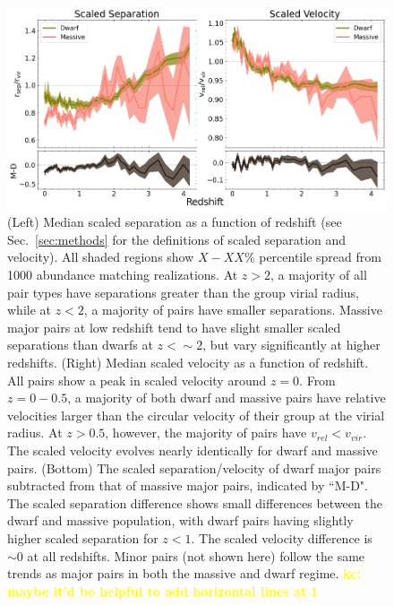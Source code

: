 \documentclass[twocolumn]{aastex631}
\newcommand{\kc}[1]{\textcolor{yellow}{\textbf{kc: #1}} }
\begin{document}
    \begin{figure}[htp]
      \centering
      \includegraphics[width=\textwidth]{scaledcombo_1000.png}
      \caption{ \label{fig:scaled}
      (Left) Median scaled separation as a function of redshift (see Sec.~\ref{sec:methods} for the definitions of scaled separation and velocity). All shaded regions show $X-XX\%$ percentile spread from 1000 abundance matching realizations. 
      At $z>2$, a majority of all pair types have separations greater than the group virial radius, while at $z<2$, a majority of pairs have smaller separations.  
      Massive major pairs at low redshift tend to have slight smaller scaled separations than dwarfs at $z<\sim2$, but vary significantly at higher redshifts. 
      (Right) Median scaled velocity as a function of redshift.
      All pairs show a peak in scaled velocity around $z=0$. From $z=0-0.5$, a majority of both dwarf and massive pairs have relative velocities larger than the circular velocity of their group at the virial radius. At $z>0.5$, however, the majority of pairs have $v_{rel}<v_{vir}$. The scaled velocity evolves nearly identically for dwarf and massive pairs.
      (Bottom) The scaled separation/velocity of dwarf major pairs subtracted from that of massive major pairs, indicated by ``M-D".
      The scaled separation difference shows small differences between the dwarf and massive population, with dwarf pairs having slightly higher scaled separation for $z<1$. The scaled velocity difference is $\sim0$ at all redshifts.
      Minor pairs (not shown here) follow the same trends as major pairs in both the massive and dwarf regime.
\kc{maybe it'd be helpful to add horizontal lines at 1 }        }
    \end{figure}
\end{document}
